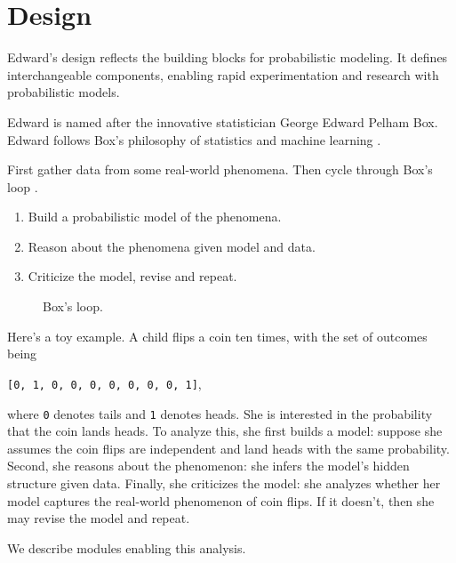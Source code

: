 \section{Design}
\label{sec:design}

Edward's design reflects the building blocks for probabilistic
modeling. It defines interchangeable components, enabling rapid
experimentation and research with probabilistic models.

Edward is named after the innovative statistician
George Edward Pelham Box. Edward follows Box's philosophy of statistics and
machine learning \citep{box1976science}.

First gather data from some real-world phenomena. Then cycle through
Box's loop \citep{blei2014build}.

\begin{enumerate}
\item Build a probabilistic model of the phenomena.
\item Reason about the phenomena given model and data.
\item Criticize the model, revise and repeat.
\end{enumerate}

\begin{figure}[htb]
\centering

\caption{Box's loop.}
\end{figure}


Here's a toy example. A child flips a coin ten times, with the set of outcomes
being

\texttt{{[}0,\ 1,\ 0,\ 0,\ 0,\ 0,\ 0,\ 0,\ 0,\ 1{]}},

where \texttt{0}
denotes tails and \texttt{1} denotes heads. She is interested in the
probability that the coin lands heads. To analyze this, she first
builds a model: suppose she assumes the coin flips are independent and
land heads with the same probability. Second, she reasons about the
phenomenon: she infers the model's hidden structure given data.
Finally, she criticizes the model: she analyzes whether her model
captures the real-world phenomenon of coin flips. If it doesn't, then
she may revise the model and repeat.

We describe modules enabling this analysis.
